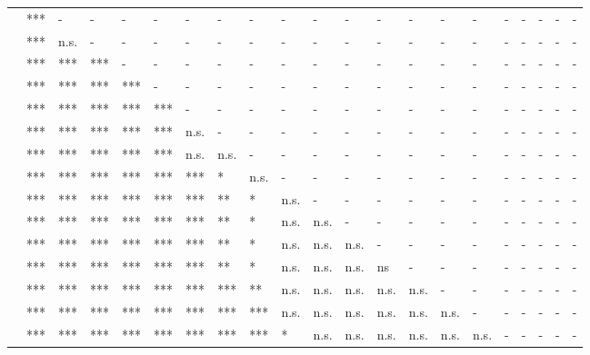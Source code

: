 \documentclass[11pt,fleqn]{article}
\newcommand{\6}{\mbox{$[\hspace*{-.6mm}[$}}
\newcommand{\9}{\mbox{$]\hspace*{-.6mm}]$}}
\begin{document}
\begin{table}[h!]
\begin{tabular}{l l l l l l l l l l l l l l l l l l l l l }
\color{brown}{\em think}\color{black}		& *** & - & - & - & - & - & - & - & - & - & - & - & - & - & - & - & - & - & - & -\\
\color{brown}{\em suggest}\color{black}			& *** & n.s. & - & - & - & - & - & - & - & - & - & - & - & - & - & - & - & - & - & - \\
\color{black}{\em hear}	\color{black}		& *** & *** & *** & - & - & - & - & - & - & - & - & - & - & - & - & - & - & - & - & -\\
\color{brown}{\em say}\color{black}		& *** & *** & *** & *** & - & - & - & - & - & - & - & - & - & - & - & - & - & - & - & -\\
\color{black}{\em announce}\color{black}		& *** & *** & *** & *** & *** & - & - & - & - & - & - & - & - & - & - & - & - & - & - & -\\
\color{black}{\em inform}\color{black}		& *** & *** & *** & *** & *** & n.s. & - & - & - & - & - & - & - & - & - & - & - & - & - & -\\
\color{airforceblue}{\em demonstrate}\color{black}		& *** & *** & *** & *** & *** & n.s. & n.s. & - & - & - & - & - & - & - & - & - & - & - & - & -\\
\color{black}{\em confess}\color{black}		& *** & *** & *** & *** & *** & *** & * & n.s. & - & - & - & - & - & - & - & - & - & - & - & -\\
\color{blue}{\em reveal}\color{black}		& *** & *** & *** & *** & *** & *** & ** & * & n.s. & - & - & - & - & - & - & - & - & - & - & -\\
\color{black}{\em acknowledge}\color{black}	& *** & *** & *** & *** & *** & *** & ** & * & n.s. & n.s. & - & - & - & - & - & - & - & - & - & -\\
\color{black}{\em admit}\color{black}			& *** & *** & *** & *** & *** & *** & ** & * & n.s. & n.s. & n.s. & - & - & - & - & - & - & - & - & -\\
\color{black}{\em establish}\color{black}		& *** & *** & *** & *** & *** & *** & ** & * & n.s. & n.s. & n.s. &  ns & - & - & - & - & - & - & - & -\\
\color{blue}{\em be annoyed}\color{black}	& *** & *** & *** & *** & *** & *** & *** & ** & n.s. & n.s. & n.s. & n.s. & n.s. & - & - & - & - & - & - & -\\
\color{blue}{\em know}\color{black}		& *** & *** & *** & *** & *** & *** & *** & *** & n.s. & n.s. & n.s. & n.s. & n.s. & n.s. & - & - & - & - & - & -\\
\color{black}{\em confirm}\color{black}		& *** & *** & *** & *** & *** & *** & *** & *** & * & n.s. & n.s. & n.s. & n.s. & n.s. & n.s. & - & - & - & - & -\\

\end{tabular}
\end{table}
\end{document}
